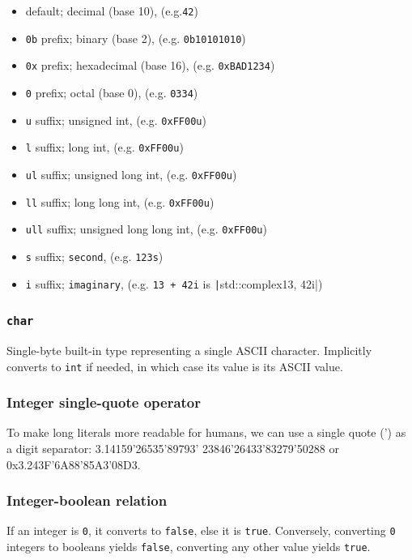 \documentclass[table, xcdraw]{article}%
\begin{document}
\begin{itemize}[leftmargin=15pt,noitemsep,nolistsep]
\item default; decimal (base 10), (e.g.\texttt{42})
\item \texttt{0b} prefix; binary (base 2), (e.g. \texttt{0b10101010})
\item \texttt{0x} prefix; hexadecimal (base 16), (e.g. \texttt{0xBAD1234})
\item \texttt{0} prefix; octal (base 0), (e.g. \texttt{0334})
\item \texttt{u} suffix; unsigned int, (e.g. \texttt{0xFF00u})
\item \texttt{l} suffix; long int, (e.g. \texttt{0xFF00u})
\item \texttt{ul} suffix; unsigned long int, (e.g. \texttt{0xFF00u})
\item \texttt{ll} suffix; long long int, (e.g. \texttt{0xFF00u})
\item \texttt{ull} suffix; unsigned long long int, (e.g. \texttt{0xFF00u})
\item \texttt{s} suffix; \texttt{second}, (e.g. \texttt{123s})
\item \texttt{i} suffix; \texttt{imaginary}, (e.g. \texttt{13 + 42i} is \texttt|std::complex{13, 42i}|)
\end{itemize}

\subsubsection{\texttt{char}}

Single-byte built-in type representing a single ASCII character. Implicitly converts to \texttt{int} if needed, in which case its value is its ASCII value.

\subsubsection{Integer single-quote operator}
To  make long literals more readable for humans, we can use a single quote (') as a digit separator: 3.14159'26535'89793' 23846'26433'83279'50288 or 0x3.243F'6A88'85A3'08D3.

\subsubsection{Integer-boolean relation}
If an integer is \texttt{0}, it converts to \texttt{false}, else it is \texttt{true}. Conversely, converting \texttt{0} integers to booleans yields \texttt{false}, converting any other value yields \texttt{true}.
\end{document}
